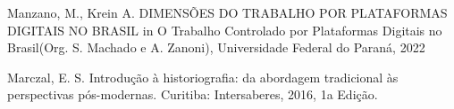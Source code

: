 \documentclass[
12pt,		%
openright,	%
twoside,  %
a4paper,			%
chapter=TITLE,		%
english,			%
french,				%
spanish,			%
brazil				%
]{USPSC-classe/USPSC}
\begin{document}
\begin{flushleft}
\begin{flushleft}
\begin{flushleft}
\begin{flushleft}
\begin{flushleft}
\begin{flushleft}
\begin{flushleft}
\begin{flushleft}
\begin{flushleft}
 Manzano, M., Krein A. DIMENS\~OES DO TRABALHO POR PLATAFORMAS DIGITAIS NO BRASIL in \textquotedbl O Trabalho Controlado por Plataformas Digitais no Brasil\textquotedbl  (Org. S. Machado e A. Zanoni), Universidade Federal do Paran\'a, 2022
\end{flushleft}


\end{flushleft}


\end{flushleft}


\end{flushleft}


\end{flushleft}


\end{flushleft}


\end{flushleft}


\end{flushleft}


\end{flushleft}


\begin{flushleft}
\begin{flushleft}
\begin{flushleft}
\begin{flushleft}
\begin{flushleft}
\begin{flushleft}
\begin{flushleft}
\begin{flushleft}
\begin{flushleft}
[MARCZAL, 2016] Marczal, E. S. Introdu\c{c}\~ao \`a historiografia: da abordagem tradicional \`as perspectivas p\'os-modernas. Curitiba: Intersaberes, 2016, 1a Edi\c{c}\~ao.
\end{flushleft}


\end{flushleft}


\end{flushleft}


\end{flushleft}


\end{flushleft}


\end{flushleft}


\end{flushleft}


\end{flushleft}


\end{flushleft}
\end{document}
